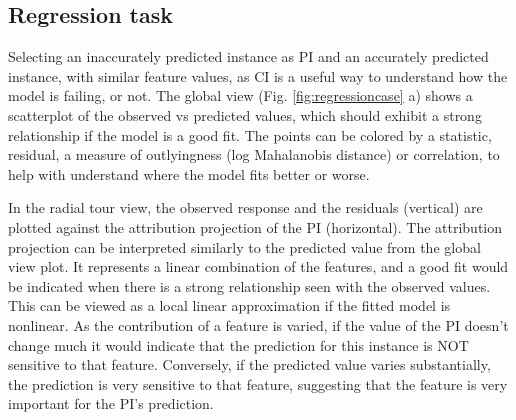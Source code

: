 \documentclass[
]{article}
\begin{document}
\hypertarget{regression-task}{%
\subsection{Regression task}\label{regression-task}}

Selecting an inaccurately predicted instance as PI and an accurately predicted instance, with similar feature values, as CI is a useful way to understand how the model is failing, or not. The global view (Fig. \ref{fig:regressioncase} a) shows a scatterplot of the observed vs predicted values, which should exhibit a strong relationship if the model is a good fit. The points can be colored by a statistic, residual, a measure of outlyingness (log Mahalanobis distance) or correlation, to help with understand where the model fits better or worse.

In the radial tour view, the observed response and the residuals (vertical) are plotted against the attribution projection of the PI (horizontal). The attribution projection can be interpreted similarly to the predicted value from the global view plot. It represents a linear combination of the features, and a good fit would be indicated when there is a strong relationship seen with the observed values. This can be viewed as a local linear approximation if the fitted model is nonlinear. As the contribution of a feature is varied, if the value of the PI doesn't change much it would indicate that the prediction for this instance is NOT sensitive to that feature. Conversely, if the predicted value varies substantially, the prediction is very sensitive to that feature, suggesting that the feature is very important for the PI's prediction.
\end{document}
